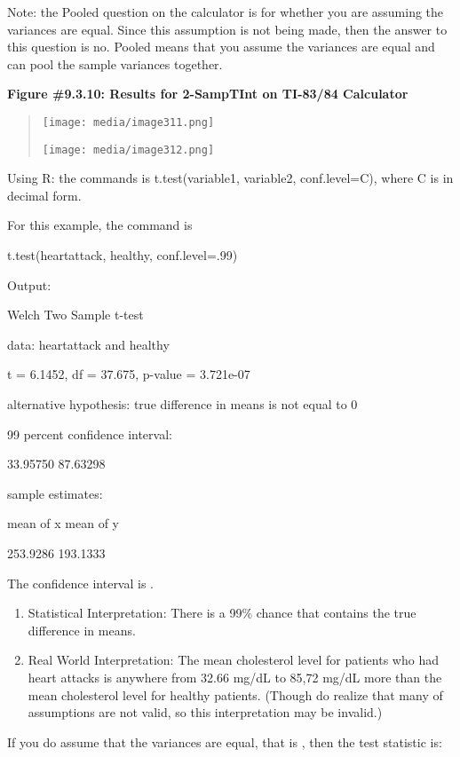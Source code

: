 \documentclass[]{book}
\begin{document}
Note: the Pooled question on the calculator is for whether you are assuming the variances are equal. Since this assumption is not being made, then the answer to this question is no. Pooled means that you assume the variances are equal and can pool the sample variances together.

\textbf{Figure \#9.3.10: Results for 2-SampTInt on TI-83/84 Calculator}

\begin{quote}
\texttt{[image: media/image311.png]}

\texttt{[image: media/image312.png]}
\end{quote}

Using R: the commands is t.test(variable1, variable2, conf.level=C), where C is in decimal form.

For this example, the command is

t.test(heartattack, healthy, conf.level=.99)

Output:

Welch Two Sample t-test

data: heartattack and healthy

t = 6.1452, df = 37.675, p-value = 3.721e-07

alternative hypothesis: true difference in means is not equal to 0

99 percent confidence interval:

33.95750 87.63298

sample estimates:

mean of x mean of y

253.9286 193.1333

The confidence interval is .

\begin{enumerate}
\def\labelenumi{\arabic{enumi}.}
\setcounter{enumi}{3}
\item
  Statistical Interpretation: There is a 99\% chance that contains the true difference in means.
\item
  Real World Interpretation: The mean cholesterol level for patients who had heart attacks is anywhere from 32.66 mg/dL to 85,72 mg/dL more than the mean cholesterol level for healthy patients. (Though do realize that many of assumptions are not valid, so this interpretation may be invalid.)
\end{enumerate}

If you do assume that the variances are equal, that is , then the test statistic is:
\end{document}
